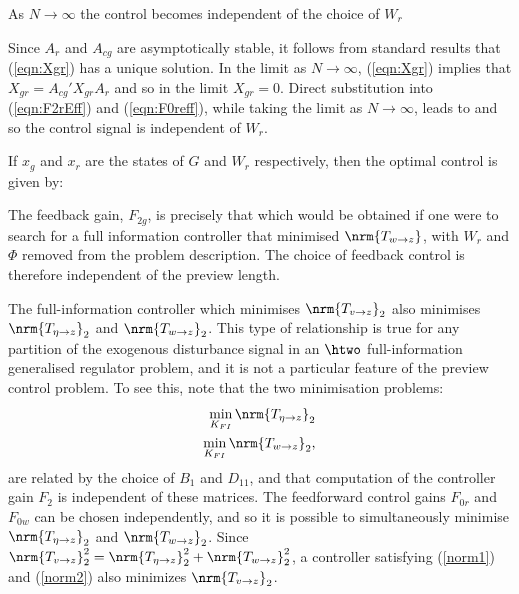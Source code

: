 \begin{cor}
As $N\rightarrow \infty$ the control becomes independent of the choice of $W_r$
\end{cor}
\begin{pf}
Since $A_r$ and $A_{cg}$ are asymptotically stable, it follows from standard results that (\ref{eqn:Xgr}) has a unique solution. In the limit as $N\rightarrow\infty$, (\ref{eqn:Xgr}) implies that $X_{gr}=A_{cg}'X_{gr}A_r$ and so in the limit $X_{gr}=0$. Direct substitution into (\ref{eqn:F2rEff}) and (\ref{eqn:F0reff}), while taking the limit as $N\rightarrow \infty$, leads to
and so the control signal is independent of $W_r$.
\end{pf}

\begin{rem}
\label{rem:PrevGainInterp}
If $x_g$ and $x_r$ are the states of $G$ and $W_r$ respectively, then the optimal control is given by:
\end{rem}

\begin{rem}
\label{rem:SmallPrevGain}
The feedback gain, $F_{2g}$, is precisely that which would be obtained if one were to search for a full information controller that minimised $\nrm{T_{w\rightarrow z}}$, with $W_r$ and $\Phi$ removed from the problem description. The choice of feedback control is therefore independent of the preview length.
\end{rem}

\begin{rem}
\label{rem:FIminwandr}
The full-information controller which minimises $\nrm{T_{v\rightarrow z}}_2$ also minimises $\nrm{T_{\eta\rightarrow z}}_2$ and $\nrm{T_{w\rightarrow z}}_2$. This type of relationship is true for any partition of the exogenous disturbance signal in an $\htwo$ full-information generalised regulator problem, and it is not a particular feature of the preview control problem. To see this, note that the two minimisation problems:
\begin{eqnarray}
\min_{K_{FI}}\nrm{T_{\eta\rightarrow z}}_2 \label{norm1} \\
\min_{K_{FI}}\nrm{T_{w\rightarrow z}}_2, \label{norm2}
\end{eqnarray}
are related by the choice of $B_1$ and $D_{11}$, and that computation of the controller gain $F_{2}$ is independent of these matrices. The feedforward control gains $F_{0r}$ and $F_{0w}$ can be chosen independently, and so it is possible to simultaneously minimise $\nrm{T_{\eta\rightarrow z}}_2$ and $\nrm{T_{w\rightarrow z}}_2$. Since $\nrm{T_{v \rightarrow z}}^2_2 = \nrm{T_{\eta\rightarrow z}}^2_2 + \nrm{T_{w \rightarrow z}}^2_2$, a controller satisfying (\ref{norm1}) and (\ref{norm2}) also minimizes $\nrm{T_{v \rightarrow z}}_2$.
\end{rem}

